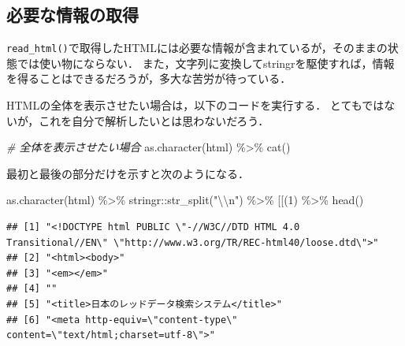 \documentclass[
]{article}
\newenvironment{Shaded}{\begin{snugshade}}{\end{snugshade}}
\newcommand{\AttributeTok}[1]{\textcolor[rgb]{0.77,0.63,0.00}{#1}}
\newcommand{\CommentTok}[1]{\textcolor[rgb]{0.56,0.35,0.01}{\textit{#1}}}
\newcommand{\DecValTok}[1]{\textcolor[rgb]{0.00,0.00,0.81}{#1}}
\newcommand{\FunctionTok}[1]{\textcolor[rgb]{0.00,0.00,0.00}{#1}}
\newcommand{\NormalTok}[1]{#1}
\newcommand{\SpecialCharTok}[1]{\textcolor[rgb]{0.00,0.00,0.00}{#1}}
\newcommand{\StringTok}[1]{\textcolor[rgb]{0.31,0.60,0.02}{#1}}
\begin{document}
\hypertarget{ux5fc5ux8981ux306aux60c5ux5831ux306eux53d6ux5f97}{%
\subsection{必要な情報の取得}\label{ux5fc5ux8981ux306aux60c5ux5831ux306eux53d6ux5f97}}

\texttt{read\_html()}で取得したHTMLには必要な情報が含まれているが，そのままの状態では使い物にならない．
また，文字列に変換してstringrを駆使すれば，情報を得ることはできるだろうが，多大な苦労が待っている．

HTMLの全体を表示させたい場合は，以下のコードを実行する．
とてもではないが，これを自分で解析したいとは思わないだろう．

\begin{Shaded}
\begin{Highlighting}[]
 \CommentTok{\# 全体を表示させたい場合}
\FunctionTok{as.character}\NormalTok{(html) }\SpecialCharTok{\%\textgreater{}\%}
  \FunctionTok{cat}\NormalTok{()}
\end{Highlighting}
\end{Shaded}

最初と最後の部分だけを示すと次のようになる．

\begin{Shaded}
\begin{Highlighting}[]
\FunctionTok{as.character}\NormalTok{(html) }\SpecialCharTok{\%\textgreater{}\%}
\NormalTok{  stringr}\SpecialCharTok{::}\FunctionTok{str\_split}\NormalTok{(}\StringTok{"}\SpecialCharTok{\textbackslash{}\textbackslash{}}\StringTok{n"}\NormalTok{) }\SpecialCharTok{\%\textgreater{}\%}
  \StringTok{\textasciigrave{}}\AttributeTok{[[}\StringTok{\textasciigrave{}}\NormalTok{(}\DecValTok{1}\NormalTok{) }\SpecialCharTok{\%\textgreater{}\%}
  \FunctionTok{head}\NormalTok{()}
\end{Highlighting}
\end{Shaded}

\begin{verbatim}
## [1] "<!DOCTYPE html PUBLIC \"-//W3C//DTD HTML 4.0 Transitional//EN\" \"http://www.w3.org/TR/REC-html40/loose.dtd\">"
## [2] "<html><body>"                                                                                                  
## [3] "<em></em>"                                                                                                     
## [4] ""                                                                                                              
## [5] "<title>日本のレッドデータ検索システム</title>"                                                                 
## [6] "<meta http-equiv=\"content-type\" content=\"text/html;charset=utf-8\">"
\end{verbatim}
\end{document}
